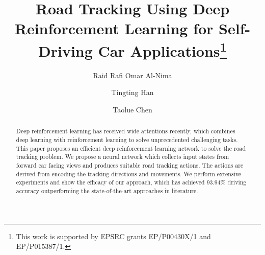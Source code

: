 \documentclass{svproc}
\begin{document}
	\mainmatter              %
\title{Road Tracking Using Deep Reinforcement Learning for Self-Driving Car Applications\thanks{This work is supported by EPSRC grants EP/P00430X/1 and EP/P015387/1.}}
	\author{Raid Rafi Omar Al-Nima \and Tingting Han \and 
		Taolue Chen}
	\maketitle              %
\begin{abstract}
	Deep reinforcement learning has received wide attentions recently, which combines deep learning with reinforcement learning to solve unprecedented challenging tasks. This paper proposes an efficient deep reinforcement learning network to solve the road tracking problem. We propose a neural network which collects input states from forward car facing views and produces suitable road tracking actions. The actions are derived from encoding the tracking directions and movements. 
	We perform extensive experiments and show the efficacy of our approach, which has achieved 93.94\% driving  accuracy outperforming the state-of-the-art approaches in literature. 
\end{abstract}
\end{document}
